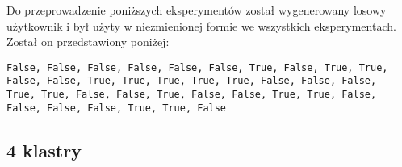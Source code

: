 \documentclass[../EDI_Task3_Karwowski_Kowalewski.tex]{subfiles}
\begin{document}
 {

    Do przeprowadzenie poniższych eksperymentów został wygenerowany losowy użytkownik i
    był użyty w niezmienionej formie we wszystkich eksperymentach. Został on
    przedstawiony poniżej:

    \begin{lstlisting}
False, False, False, False, False, False, True, False, True, True,
False, False, True, True, True, True, True, False, False, False,
True, True, False, False, True, False, False, True, True, False,
False, False, False, True, True, False
    \end{lstlisting}

    \subsection{4 klastry}
    \label{results_k_4} {

}}
\end{document}
